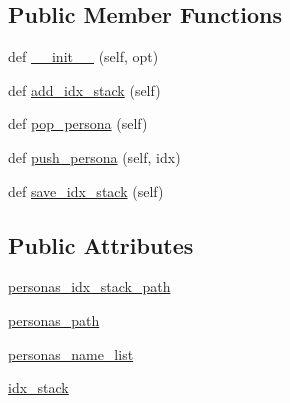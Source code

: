 \subsection*{Public Member Functions}
\begin{DoxyCompactItemize}
\item 
def \hyperlink{classparlai_1_1mturk_1_1tasks_1_1personachat_1_1personachat__chat_1_1worlds_1_1PersonasGenerator_a5d28818c8d8f07d9f0fa0fdac8a9f516}{\+\_\+\+\_\+init\+\_\+\+\_\+} (self, opt)
\item 
def \hyperlink{classparlai_1_1mturk_1_1tasks_1_1personachat_1_1personachat__chat_1_1worlds_1_1PersonasGenerator_a432b4b3a15961d806c89e1a9c840bd4b}{add\+\_\+idx\+\_\+stack} (self)
\item 
def \hyperlink{classparlai_1_1mturk_1_1tasks_1_1personachat_1_1personachat__chat_1_1worlds_1_1PersonasGenerator_a30fafb7faad8a5ad1c0c15bb2e1789f8}{pop\+\_\+persona} (self)
\item 
def \hyperlink{classparlai_1_1mturk_1_1tasks_1_1personachat_1_1personachat__chat_1_1worlds_1_1PersonasGenerator_a378e086892092b573b4e4014e8d6abc5}{push\+\_\+persona} (self, idx)
\item 
def \hyperlink{classparlai_1_1mturk_1_1tasks_1_1personachat_1_1personachat__chat_1_1worlds_1_1PersonasGenerator_a49c91f6d43cf77f815700b6837f0400d}{save\+\_\+idx\+\_\+stack} (self)
\end{DoxyCompactItemize}
\subsection*{Public Attributes}
\begin{DoxyCompactItemize}
\item 
\hyperlink{classparlai_1_1mturk_1_1tasks_1_1personachat_1_1personachat__chat_1_1worlds_1_1PersonasGenerator_ac13e6005f73e2172b1e188bf7aa3debf}{personas\+\_\+idx\+\_\+stack\+\_\+path}
\item 
\hyperlink{classparlai_1_1mturk_1_1tasks_1_1personachat_1_1personachat__chat_1_1worlds_1_1PersonasGenerator_a8fca2a7dc0bf0414a2e46024de75882b}{personas\+\_\+path}
\item 
\hyperlink{classparlai_1_1mturk_1_1tasks_1_1personachat_1_1personachat__chat_1_1worlds_1_1PersonasGenerator_ac31580ffc80d96ba4a04480e1961fdde}{personas\+\_\+name\+\_\+list}
\item 
\hyperlink{classparlai_1_1mturk_1_1tasks_1_1personachat_1_1personachat__chat_1_1worlds_1_1PersonasGenerator_a608c0f26f6e8ca388ce2e336068fae51}{idx\+\_\+stack}
\end{DoxyCompactItemize}


